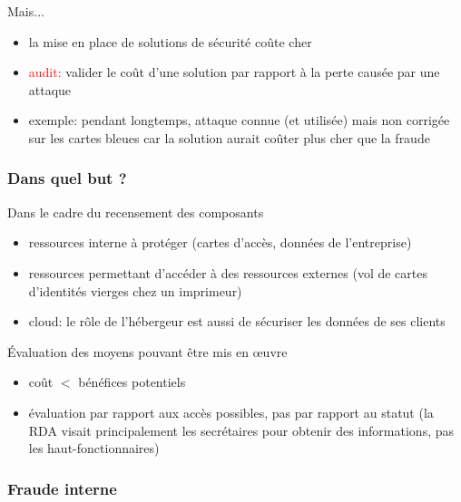 \begin{reveals}
\begin{frame}
  \vfill

  \begin{block}{Mais...}
    \begin{itemize}
    \item la mise en place de solutions de sécurité coûte cher
    \item \textcolor{red}{audit:} valider le coût d'une solution par rapport à la perte causée par une attaque
    \item exemple: pendant longtemps, attaque connue (et utilisée)
      mais non corrigée sur les cartes bleues car la solution aurait
      coûter plus cher que la fraude
    \end{itemize}
  \end{block}
  \vfill
\end{frame}
\begin{frame}
  \frametitle{Dans quel but ?}

  \vfill

  \begin{block}{Dans le cadre du recensement des composants}
    \begin{itemize}
    \item ressources interne à protéger (cartes d'accès, données de
      l'entreprise)
    \item ressources permettant d'accéder à des ressources externes
      (vol de cartes d'identités vierges chez un imprimeur)
    \item cloud: le rôle de l'hébergeur est aussi de sécuriser les
      données de ses clients
    \end{itemize}
  \end{block}

  \vfill

  \begin{block}{Évaluation des moyens pouvant être mis en \oe uvre}
    \begin{itemize}
    \item coût \(<\) bénéfices potentiels
    \item évaluation par rapport aux accès possibles, pas par rapport
      au statut (la RDA visait principalement les secrétaires pour
      obtenir des informations, pas les haut-fonctionnaires)
    \end{itemize}
  \end{block}

\end{frame}

\begin{frame}
  \frametitle{Fraude interne}


\end{frame}
\end{reveals}

